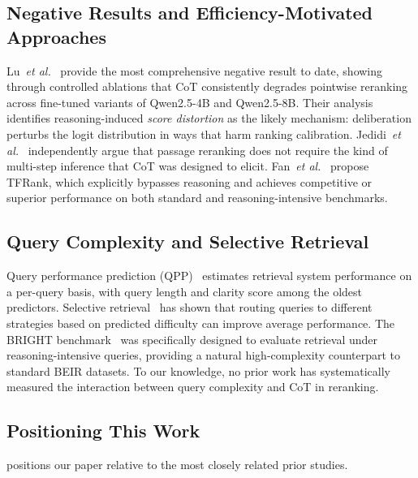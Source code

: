 \documentclass[12pt]{article}
\newcommand{\CoT}{CoT}
\newcommand{\etal}{\textit{et al.}}
\begin{document}
\subsection{Negative Results and Efficiency-Motivated Approaches}

Lu~\etal~\citep{lu2025rethinking} provide the most comprehensive negative
result to date, showing through controlled ablations that \CoT{} consistently
degrades pointwise reranking across fine-tuned variants of Qwen2.5-4B and
Qwen2.5-8B.  Their analysis identifies reasoning-induced \emph{score
distortion} as the likely mechanism: deliberation perturbs the logit
distribution in ways that harm ranking calibration.  Jedidi~\etal~\citep{jedidi2025dont}
independently argue that passage reranking does not require the kind of
multi-step inference that \CoT{} was designed to elicit.
Fan~\etal~\citep{fan2025tfrank} propose TFRank, which explicitly bypasses
reasoning and achieves competitive or superior performance on both standard and
reasoning-intensive benchmarks.

\subsection{Query Complexity and Selective Retrieval}

Query performance prediction (QPP)~\citep{cronen2002predicting} estimates
retrieval system performance on a per-query basis, with query length and
clarity score among the oldest predictors.  Selective
retrieval~\citep{arabzadeh2021shallow} has shown that routing queries to
different strategies based on predicted difficulty can improve average
performance.  The BRIGHT benchmark~\citep{su2024bright} was specifically
designed to evaluate retrieval under reasoning-intensive queries, providing a
natural high-complexity counterpart to standard BEIR datasets.  To our
knowledge, no prior work has systematically measured the interaction between
query complexity and \CoT{} in reranking.

\subsection{Positioning This Work}

 positions our paper relative to the most closely related
prior studies.
\end{document}
